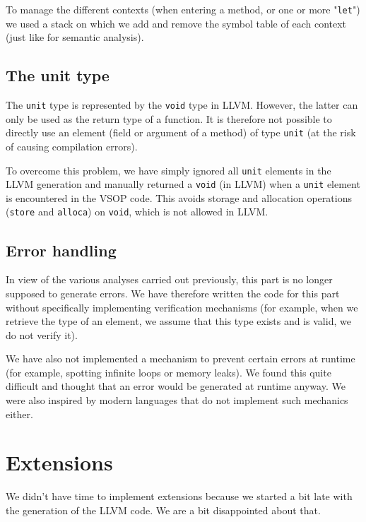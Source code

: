 \documentclass[a4paper, 12pt]{article}
\begin{document}
    To manage the different contexts (when entering a method, or one or more "\texttt{let}") we used a stack on which we add and remove the symbol table of each context (just like for semantic analysis).
    
    \subsection{The unit type}
    
    The \texttt{unit} type is represented by the \texttt{void} type in LLVM. However, the latter can only be used as the return type of a function. It is therefore not possible to directly use an element (field or argument of a method) of type \texttt{unit} (at the risk of causing compilation errors).
    
    To overcome this problem, we have simply ignored all \texttt{unit} elements in the LLVM generation and manually returned a \texttt{void} (in LLVM) when a \texttt{unit} element is encountered in the VSOP code. This avoids storage and allocation operations (\texttt{store} and \texttt{alloca}) on \texttt{void}, which is not allowed in LLVM.
    
    \subsection{Error handling}
    
    In view of the various analyses carried out previously, this part is no longer supposed to generate errors. We have therefore written the code for this part without specifically implementing verification mechanisms (for example, when we retrieve the type of an element, we assume that this type exists and is valid, we do not verify it).
    
    We have also not implemented a mechanism to prevent certain errors at runtime (for example, spotting infinite loops or memory leaks). We found this quite difficult and thought that an error would be generated at runtime anyway. We were also inspired by modern languages that do not implement such mechanics either.
    
    
    \section{Extensions}
    
    We didn't have time to implement extensions because we started a bit late with the generation of the LLVM code. We are a bit disappointed about that.
    
\end{document}
